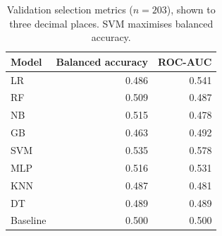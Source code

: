 \begin{table}[tb]
\centering\footnotesize
\caption{Validation selection metrics ($n=203$), shown to three decimal places. SVM maximises balanced accuracy.}\label{tab:validation}
\setlength{\tabcolsep}{3pt}
\begin{tabular}{lrr}
\toprule
Model & Balanced accuracy & ROC-AUC \\
\midrule
LR & 0.486 & 0.541 \\
RF & 0.509 & 0.487 \\
NB & 0.515 & 0.478 \\
GB & 0.463 & 0.492 \\
SVM & 0.535 & 0.578 \\
MLP & 0.516 & 0.531 \\
KNN & 0.487 & 0.481 \\
DT & 0.489 & 0.489 \\
Baseline & 0.500 & 0.500 \\
\bottomrule
\end{tabular}
\end{table}
